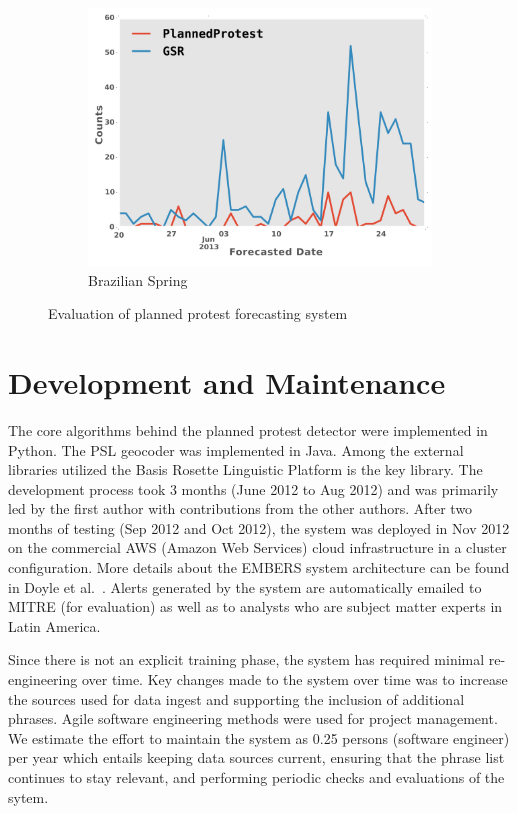 \documentclass[letterpaper]{article}
\begin{document}
\begin{figure}
\begin{subfigure}{0.40\columnwidth}
  \includegraphics[scale=0.2]{brazil_june_new}
  \caption{\scriptsize Brazilian Spring}
  \label{fig:brazil_june}
\end{subfigure}\hspace{.5pt}
\caption{Evaluation of planned protest forecasting system}
\end{figure}%


\section{Development and Maintenance}
The core algorithms behind the
planned protest detector were implemented in Python. The PSL geocoder was
implemented in Java. Among the external libraries utilized the Basis Rosette Linguistic Platform is the key
library. The development process took 3 months (June
2012 to Aug 2012) and was
primarily led by the first author with contributions from the other authors.
After two months of testing (Sep 2012 and Oct 2012), the system was deployed
in Nov 2012 on the commercial AWS (Amazon
Web Services) cloud infrastructure in a cluster configuration. 
More details about the EMBERS 
system architecture can be found in
Doyle et al.~. Alerts
generated by the system are automatically emailed to MITRE (for evaluation)
as well as to analysts who are subject matter experts in Latin America.

Since there is not an explicit training
phase, the system has required minimal re-engineering over time. Key changes
made to the system over time was to increase the sources used for data ingest
and supporting the inclusion of additional phrases. Agile software
engineering methods were used for project management. We estimate the
effort to maintain the system as 0.25 persons (software engineer) per year
which entails keeping data sources current, ensuring that
the phrase list continues to stay relevant, and performing periodic 
checks and evaluations of the sytem.
\end{document}
